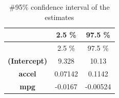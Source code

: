 \documentclass[]{article}
\begin{document}
\begin{longtable}[]{@{}ccc@{}}
\caption{\#95\% confidence interval of the estimates}\tabularnewline
\toprule
\begin{minipage}[b]{0.23\columnwidth}\centering\strut
~\strut
\end{minipage} & \begin{minipage}[b]{0.13\columnwidth}\centering\strut
2.5 \%\strut
\end{minipage} & \begin{minipage}[b]{0.13\columnwidth}\centering\strut
97.5 \%\strut
\end{minipage}\tabularnewline
\midrule
\endfirsthead
\toprule
\begin{minipage}[b]{0.23\columnwidth}\centering\strut
~\strut
\end{minipage} & \begin{minipage}[b]{0.13\columnwidth}\centering\strut
2.5 \%\strut
\end{minipage} & \begin{minipage}[b]{0.13\columnwidth}\centering\strut
97.5 \%\strut
\end{minipage}\tabularnewline
\midrule
\endhead
\begin{minipage}[t]{0.23\columnwidth}\centering\strut
\textbf{(Intercept)}\strut
\end{minipage} & \begin{minipage}[t]{0.13\columnwidth}\centering\strut
9.328\strut
\end{minipage} & \begin{minipage}[t]{0.13\columnwidth}\centering\strut
10.13\strut
\end{minipage}\tabularnewline
\begin{minipage}[t]{0.23\columnwidth}\centering\strut
\textbf{accel}\strut
\end{minipage} & \begin{minipage}[t]{0.13\columnwidth}\centering\strut
0.07142\strut
\end{minipage} & \begin{minipage}[t]{0.13\columnwidth}\centering\strut
0.1142\strut
\end{minipage}\tabularnewline
\begin{minipage}[t]{0.23\columnwidth}\centering\strut
\textbf{mpg}\strut
\end{minipage} & \begin{minipage}[t]{0.13\columnwidth}\centering\strut
-0.0167\strut
\end{minipage} & \begin{minipage}[t]{0.13\columnwidth}\centering\strut
-0.00524\strut
\end{minipage}\tabularnewline
\bottomrule
\end{longtable}
\end{document}
